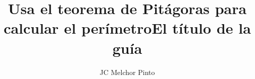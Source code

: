 \documentclass[12pt,addpoints,answers]{guia}
\title{Usa el teorema de Pitágoras para calcular el perímetro}
\title{El título de la guía}
\author{JC Melchor Pinto}
\begin{document}
\pagestyle{headandfoot}

\INFO
\vspace{-0.5cm}
\begin{multicols}{2}
    
    
    
    \columnbreak
    
    
\end{multicols}
\begin{questions}
    \questionboxed[10]{}
    \questionboxed[10]{}
    \questionboxed[10]{}
    \questionboxed[10]{}
    \questionboxed[10]{}
    \questionboxed[10]{}
    \questionboxed[10]{}
    \questionboxed[10]{}
    \questionboxed[10]{}
    \questionboxed[10]{}
\end{questions}
\end{document}
